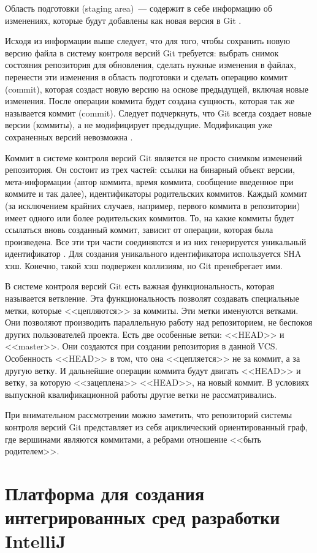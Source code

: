 Область подготовки (staging area)~--- содержит в себе информацию об изменениях, которые будут добавлены как новая версия в Git \cite{pro-git}. 

Исходя из информации выше следует, что для того, чтобы сохранить новую версию файла в систему контроля версий Git требуется: выбрать снимок состояния репозитория для обновления, сделать нужные изменения в файлах, перенести эти изменения в область подготовки и сделать операцию коммит (commit), которая создаст новую версию на основе предыдущей, включая новые изменения. После операции коммита будет создана сущность, которая так же называется коммит (commit). Следует подчеркнуть, что Git всегда создает новые версии (коммиты), а не модифицирует предыдущие. Модификация уже сохраненных версий невозможна \cite{pro-git}.

Коммит в системе контроля версий Git является не просто снимком изменений репозитория. Он состоит из трех частей: ссылки на бинарный объект версии, мета-информации (автор коммита, время коммита, сообщение введенное при коммите и так далее), идентификаторы родительских коммитов. Каждый коммит (за исключением крайних случаев, например, первого коммита в репозитории) имеет одного или более родительских коммитов. То, на какие коммиты будет ссылаться вновь созданный коммит, зависит от операции, которая была произведена. Все эти три части соединяются и из них генерируется уникальный идентификатор \cite{pro-git}. Для создания уникального идентификатора используется SHA хэш. Конечно, такой хэш подвержен коллизиям, но Git пренебрегает ими.

В системе контроля версий Git есть важная функциональность, которая называется ветвление. Эта функциональность позволят создавать специальные метки, которые <<цепляются>> за коммиты. Эти метки именуются ветками. Они позволяют производить параллельную работу над репозиторием, не беспокоя других пользователей проекта. Есть две особенные ветки: <<HEAD>> и <<master>>. Они создаются при создании репозитория в данной VCS. Особенность <<HEAD>> в том, что она <<цепляется>> не за коммит, а за другую ветку. И дальнейшие операции коммита будут двигать <<HEAD>> и ветку, за которую <<зацеплена>> <<HEAD>>, на новый коммит. В условиях выпускной квалификационной работы другие ветки не рассматривались.

При внимательном рассмотрении можно заметить, что репозиторий системы контроля версий Git представляет из себя ациклический ориентированный граф, где вершинами являются коммитами, а ребрами отношение <<быть родителем>>.
\section{Платформа для создания интегрированных сред разработки IntelliJ}

